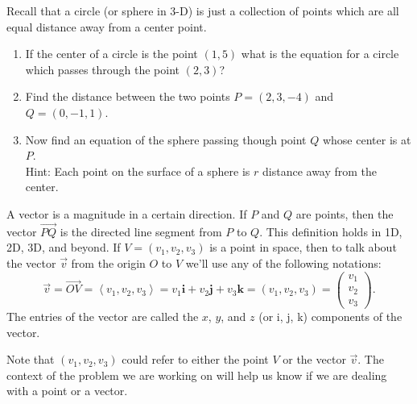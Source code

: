 \begin{problem}
Recall that a circle (or sphere in 3-D) is just a collection of points which are all equal distance away from a center point.
\begin{enumerate}
\item If the center of a circle is the point $(1,5)$ what is the equation for a circle which passes through the point $(2,3)$?
\item Find the distance between the two points $P=(2,3,-4)$ and $Q=(0,-1,1)$. 
\item Now find an equation of the sphere passing though point $Q$ whose center is at $P$. \\
Hint: Each point on the surface of a sphere is $r$ distance away from the center.
\end{enumerate}
\end{problem}



\begin{definition}
A vector is a magnitude in a certain direction.  
If $P$ and $Q$ are points, then the vector $\vec{PQ}$ is the directed line segment from $P$ to $Q$. This definition holds in 1D, 2D, 3D, and beyond.  
If $V=(v_1,v_2,v_3)$ is a point in space, then to talk about the vector $\vec v$ from the origin $O$ to $V$ we'll use any of the following notations:
$$\vec v = \vec{OV}=\left<v_1,v_2,v_3\right> 
= v_1\mathbf{i}+v_2\mathbf{j}+v_3\mathbf{k} 
= (v_1,v_2,v_3) 
= \begin{pmatrix}v_1\\ v_2\\ v_3\end{pmatrix}
.$$
The entries of the vector are called the $x$, $y$, and $z$ (or i, j, k) components of the vector. 
\end{definition}
Note that $(v_1,v_2,v_3)$ could refer to either the point $V$ or the vector $\vec v$. The context of the problem we are working on will help us know if we are dealing with a point or a vector.

